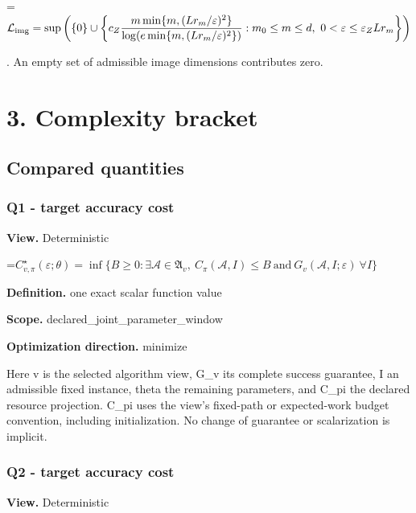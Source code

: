 \documentclass[10pt,a4paper]{article}
\newcommand{\AtlasMath}[1]{\par\begingroup\centering\setbox0=\hbox{$\displaystyle #1$}\ifdim\wd0>1.4\linewidth\typeout{ATLAS WIDE FORMULA: \the\wd0}\fi\ifdim\wd0>\linewidth\resizebox{\linewidth}{!}{\box0}\else\box0\fi\par\endgroup}
\begin{document}
\AtlasMath{\mathcal L_{\rm img}=\sup\left(\{0\}\cup\left\{c_Z\frac{m\min\{m,(Lr_m/\varepsilon)^2\}}{\log(e\min\{m,(Lr_m/\varepsilon)^2\})}:m_0\le m\le d,\ 0<\varepsilon\le\varepsilon_ZLr_m\right\}\right)}
. An empty set of admissible image dimensions contributes zero.



\section{3. Complexity bracket}


\subsection{Compared quantities}


\subsubsection{Q1 - target accuracy cost}


\textbf{View.} Deterministic



\AtlasMath{C^\star_{v,\pi}(\varepsilon;\theta)=\inf\{B\ge0:\exists\mathcal A\in\mathfrak A_v,\ C_\pi(\mathcal A,I)\le B\ \text{and}\ G_v(\mathcal A,I;\varepsilon)\ \forall I\}}


\textbf{Definition.} one exact scalar function value



\textbf{Scope.} declared\_joint\_parameter\_window



\textbf{Optimization direction.} minimize



Here v is the selected algorithm view, G\_v its complete success guarantee, I an admissible fixed instance, theta the remaining parameters, and C\_pi the declared resource projection. C\_pi uses the view's fixed-path or expected-work budget convention, including initialization. No change of guarantee or scalarization is implicit.



\subsubsection{Q2 - target accuracy cost}


\textbf{View.} Deterministic
\end{document}
